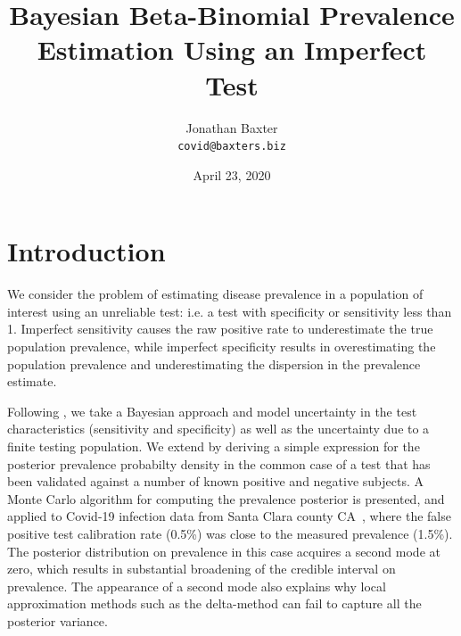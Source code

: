 \documentclass[dvipdfmx]{article}
\begin{document}
\title{Bayesian Beta-Binomial Prevalence Estimation Using an Imperfect
  Test} \author{Jonathan Baxter\\\tt{covid@baxters.biz}} \date{April
  23, 2020}\maketitle {}

\section{Introduction}
We consider the problem of estimating disease prevalence in a
population of interest using an unreliable test: i.e. a test with
specificity or sensitivity less than 1. Imperfect sensitivity causes
the raw positive rate to underestimate the true population prevalence,
while imperfect specificity results in overestimating the population
prevalence and underestimating the dispersion in the prevalence
estimate.

Following \cite{diggle_2011,greenland_1996}, we take a Bayesian
approach and model uncertainty in the test characteristics
(sensitivity and specificity) as well as the uncertainty due to a
finite testing population. We extend \cite{diggle_2011} by deriving a
simple expression for the posterior prevalence probabilty density in
the common case of a test that has been validated against a number of
known positive and negative subjects. A Monte Carlo algorithm for
computing the prevalence posterior is presented, and applied to
Covid-19 infection data from Santa Clara county
CA~\cite{Bendavid2020.04.14.20062463}, where the false positive test
calibration rate (0.5\%) was close to the measured prevalence
(1.5\%). The posterior distribution on prevalence in this case
acquires a second mode at zero, which results in substantial
broadening of the credible interval on prevalence. The appearance of a
second mode also explains why local approximation methods such as the
delta-method can fail to capture all the posterior variance.
\end{document}

